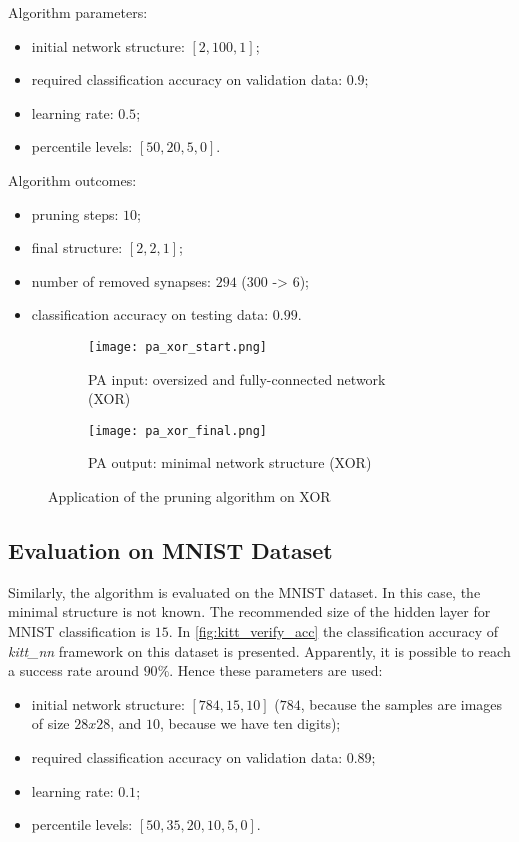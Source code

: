 Algorithm parameters:
\begin{itemize}
\item initial network structure: $ [2, 100, 1] $;
\item required classification accuracy on validation data: $ 0.9 $;
\item learning rate: $ 0.5 $;
\item percentile levels: $ [50, 20, 5, 0] $.
\end{itemize}

Algorithm outcomes:
\begin{itemize}
\item pruning steps: $ 10 $;
\item final structure: $ [2, 2, 1] $;
\item number of removed synapses: $ 294 $ ($ 300 $ -> $ 6 $);
\item classification accuracy on testing data: $ 0.99 $.
\end{itemize}

\begin{figure}[H]
\centering
\begin{subfigure}{0.45\textwidth}
  \centering
  \texttt{[image: pa\_xor\_start.png]}
  \caption{PA input: oversized and fully-connected network (XOR)}
  \label{img:pa_xor_start}
\end{subfigure}%
\begin{subfigure}{0.45\textwidth}
  \centering
  \texttt{[image: pa\_xor\_final.png]}
  \caption{PA output: minimal network structure (XOR)}
  \label{img:pa_xor_final}
\end{subfigure}
\caption{Application of the pruning algorithm on XOR}
\label{img:pa_xor_morph}
\end{figure}

\subsection{Evaluation on MNIST Dataset} \label{ssec:evaluation_on_mnist}
Similarly, the algorithm is evaluated on the MNIST dataset. In this case, the minimal structure is not known. The recommended size of the hidden layer for MNIST classification is $ 15 $. In \cref{fig:kitt_verify_acc} the classification accuracy of \textit{kitt\_nn} framework on this dataset is presented. Apparently, it is possible to reach a success rate around $ 90\% $. Hence these parameters are used:

\begin{itemize}
\item initial network structure: $ [784, 15, 10] $ ($ 784 $, because the samples are images of size $ 28x28 $, and $ 10 $, because we have ten digits);
\item required classification accuracy on validation data: $ 0.89 $;
\item learning rate: $ 0.1 $;
\item percentile levels: $ [50, 35, 20, 10, 5, 0] $.
\end{itemize}

